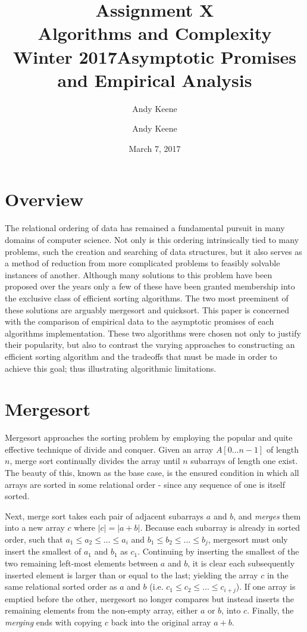 \documentclass[11pt,letterpaper]{report}
\author{Andy Keene}
\title{Assignment X\\Algorithms and Complexity\\ Winter 2017}
\date{}
\title{Asymptotic Promises and Empirical Analysis}
\author{Andy Keene}
\date{March 7, 2017}
\begin{document}
\maketitle

\section*{Overview}
The relational ordering of data has remained a fundamental pursuit in many domains of computer science. Not only is this ordering intrinsically tied to many problems, such the creation and searching of data structures, but it also serves as a method of reduction from more complicated problems to feasibly solvable instances of another. Although many solutions to this problem have been proposed over the years only a few of these have been granted membership into the exclusive class of efficient sorting algorithms. The two most preeminent of these solutions are arguably mergesort and quicksort. This paper is concerned with the comparison of empirical data to the asymptotic promises of each algorithms implementation. These two algorithms were chosen not only to justify their popularity, but also to contrast the varying approaches to constructing an efficient sorting algorithm and the tradeoffs that must be made in order to achieve this goal; thus illustrating algorithmic limitations.

\section*{Mergesort}			%
Mergesort approaches the sorting problem by employing the popular and quite effective technique of divide and conquer. Given an array $A[0...n-1]$ of length $n$, merge sort continually divides the array until $n$ subarrays of length one exist. The beauty of this, known as the base case, is the ensured condition in which all arrays are sorted in some relational order - since any sequence of one is itself sorted. 

Next, merge sort takes each pair of adjacent subarrays $a$ and $b$, and \emph{merges} them into a new array $c$ where $|c|=|a+b|$. Because each subarray is already in sorted order, such that $a_1 \leq a_2 \leq ... \leq a_i$ and $b_1 \leq b_2 \leq ... \leq b_j$, mergesort must only insert the smallest of $a_1$ and $b_1$ as $c_1$. Continuing by inserting the smallest of the two remaining left-most elements between $a$ and $b$, it is clear each subsequently inserted element is larger than or equal to the last; yielding the array $c$ in the same relational sorted order as $a$ and $b$ (i.e. $c_1 \leq c_2 \leq ... \leq c_{i+j}$). If one array is emptied before the other, mergesort no longer compares but instead inserts the remaining elements from the non-empty array, either $a$ or $b$, into $c$.  Finally, the \emph{merging} ends with copying $c$ back into the original array $a+b$. 
\end{document}
